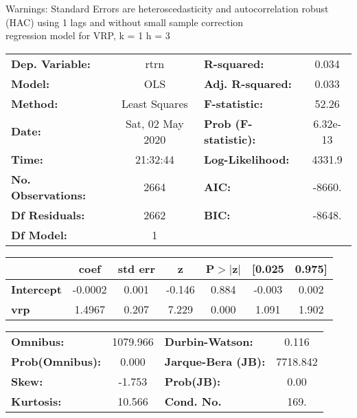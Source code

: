 Warnings: \newline
 [1] Standard Errors are heteroscedasticity and autocorrelation robust (HAC) using 1 lags and without small sample correction\\ 

regression model for VRP, k = 1 h = 3\begin{center}
\begin{tabular}{lclc}
\toprule
\textbf{Dep. Variable:}    &       rtrn       & \textbf{  R-squared:         } &     0.034   \\
\textbf{Model:}            &       OLS        & \textbf{  Adj. R-squared:    } &     0.033   \\
\textbf{Method:}           &  Least Squares   & \textbf{  F-statistic:       } &     52.26   \\
\textbf{Date:}             & Sat, 02 May 2020 & \textbf{  Prob (F-statistic):} &  6.32e-13   \\
\textbf{Time:}             &     21:32:44     & \textbf{  Log-Likelihood:    } &    4331.9   \\
\textbf{No. Observations:} &        2664      & \textbf{  AIC:               } &    -8660.   \\
\textbf{Df Residuals:}     &        2662      & \textbf{  BIC:               } &    -8648.   \\
\textbf{Df Model:}         &           1      & \textbf{                     } &             \\
\bottomrule
\end{tabular}
\begin{tabular}{lcccccc}
                   & \textbf{coef} & \textbf{std err} & \textbf{z} & \textbf{P$> |$z$|$} & \textbf{[0.025} & \textbf{0.975]}  \\
\midrule
\textbf{Intercept} &      -0.0002  &        0.001     &    -0.146  &         0.884        &       -0.003    &        0.002     \\
\textbf{vrp}       &       1.4967  &        0.207     &     7.229  &         0.000        &        1.091    &        1.902     \\
\bottomrule
\end{tabular}
\begin{tabular}{lclc}
\textbf{Omnibus:}       & 1079.966 & \textbf{  Durbin-Watson:     } &    0.116  \\
\textbf{Prob(Omnibus):} &   0.000  & \textbf{  Jarque-Bera (JB):  } & 7718.842  \\
\textbf{Skew:}          &  -1.753  & \textbf{  Prob(JB):          } &     0.00  \\
\textbf{Kurtosis:}      &  10.566  & \textbf{  Cond. No.          } &     169.  \\
\bottomrule
\end{tabular}
\end{center}

